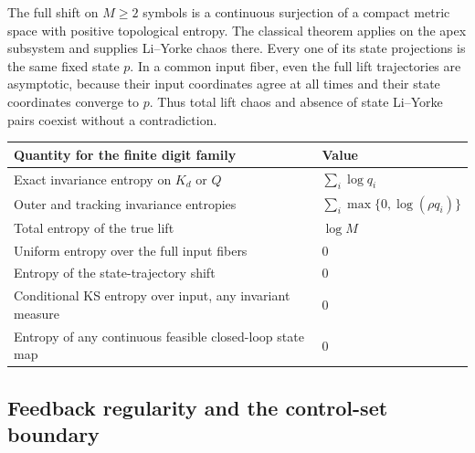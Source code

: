 \documentclass[11pt,a4paper]{article}
\theoremstyle{definition}
\theoremstyle{remark}
\begin{document}
The full shift on \(M\geq2\) symbols is a continuous surjection of a compact metric space with positive topological entropy. The classical theorem \cite[Corollary 2.4(2)]{BGKM} applies on the apex subsystem and supplies Li--Yorke chaos there. Every one of its state projections is the same fixed state \(p\). In a common input fiber, even the full lift trajectories are asymptotic, because their input coordinates agree at all times and their state coordinates converge to \(p\). Thus total lift chaos and absence of state Li--Yorke pairs coexist without a contradiction.

\begin{center}
\begin{tabular}{@{}ll@{}}
\toprule
Quantity for the finite digit family & Value\\
\midrule
Exact invariance entropy on \(K_d\) or \(Q\) & \(\sum_i\log q_i\)\\
Outer and tracking invariance entropies & \(\sum_i\max\{0,\log(\rho q_i)\}\)\\
Total entropy of the true lift & \(\log M\)\\
Uniform entropy over the full input fibers & \(0\)\\
Entropy of the state-trajectory shift & \(0\)\\
Conditional KS entropy over input, any invariant measure & \(0\)\\
Entropy of any continuous feasible closed-loop state map & \(0\)\\
\bottomrule
\end{tabular}
\end{center}

\subsection{Feedback regularity and the control-set boundary}
\end{document}
